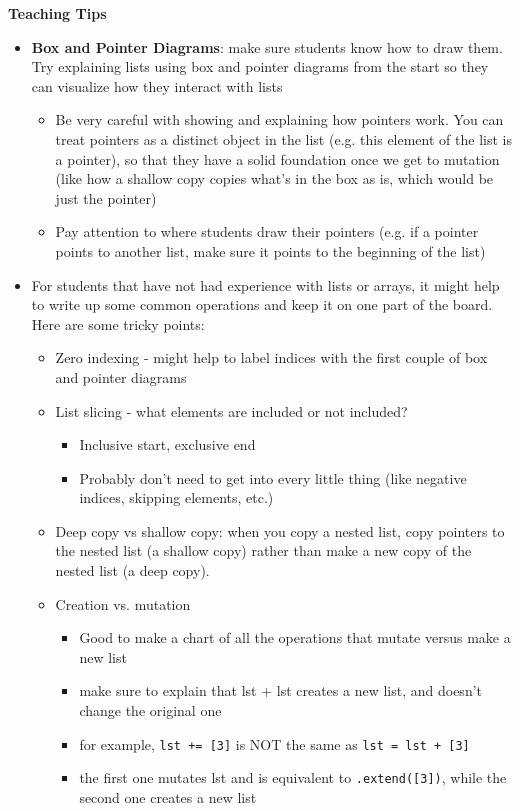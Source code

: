 \begin{blocksection}
	\begin{guide}
	\textbf{Teaching Tips}
	\begin{itemize}
			\item \textbf{Box and Pointer Diagrams}: make sure students know how to draw them. Try explaining lists using box and pointer diagrams from the start so they can visualize how they interact with lists
			\begin{itemize}
				\item Be very careful with showing and explaining how pointers work. You can treat pointers as a distinct object in the list (e.g. this element of the list is a pointer), so that they have a solid foundation once we get to mutation (like how a shallow copy copies what’s in the box as is, which would be just the pointer)
				\item Pay attention to where students draw their pointers (e.g. if a pointer points to another list, make sure it points to the beginning of the list)
			\end{itemize}
			\item For students that have not had experience with lists or arrays, it might help to write up some common operations and keep it on one part of the board. Here are some tricky points:
			\begin{itemize}
				\item Zero indexing - might help to label indices with the first couple of box and pointer diagrams
				\item List slicing - what elements are included or not included?
				\begin{itemize}
					\item Inclusive start, exclusive end
					\item Probably don’t need to get into every little thing (like negative indices, skipping elements, etc.) 
				\end{itemize}
				\item Deep copy vs shallow copy: when you copy a nested list, copy pointers to the nested list (a shallow copy) rather than make a new copy of the nested list (a deep copy).
				\item Creation vs. mutation
				\begin{itemize}
					\item Good to make a chart of all the operations that mutate versus make a new list
					\item make sure to explain that lst + lst creates a new list, and doesn’t change the original one
					\item for example, \texttt{lst += [3]} is NOT the same as \texttt{lst = lst + [3]}
					\item the first one mutates lst and is equivalent to \texttt{.extend([3])}, while the second one creates a new list
				\end{itemize}
			\end{itemize}
	\end{itemize}
	\end{guide}
\end{blocksection}
